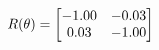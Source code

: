\documentclass[preview]{standalone}
\begin{document}
\begin{align*}
\special{dvisvgm:raw <g id='unique000'>}R(\theta) = \begin{bmatrix}-1.00 & -0.03\\0.03 & -1.00\end{bmatrix}\special{dvisvgm:raw </g>}
\end{align*}
\end{document}
